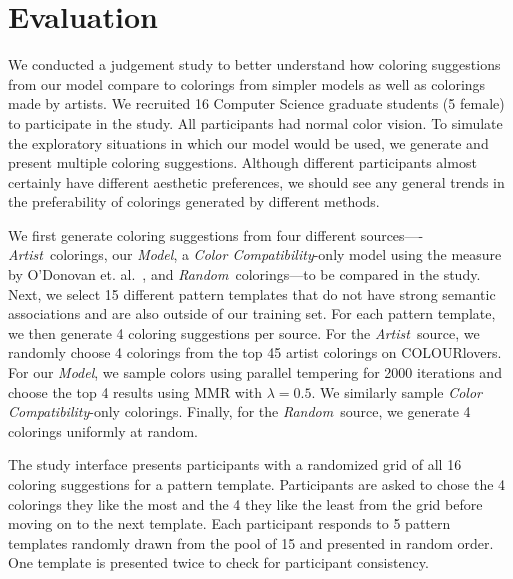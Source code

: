\section{Evaluation}
\label{sec:evaluation}

We conducted a judgement study to better understand how coloring suggestions from our model compare to colorings from simpler models as well as colorings made by artists. We recruited 16 Computer Science graduate students (5 female) to participate in the study. All participants had normal color vision. To simulate the exploratory situations in which our model would be used, we generate and present multiple coloring suggestions. Although different participants almost certainly have different aesthetic preferences, we should see any general trends in the preferability of colorings generated by different methods. 

\newcommand{\artistSource}{\emph{Artist}}
\newcommand{\modelSource}{\emph{Model}}
\newcommand{\compatSource}{\emph{Color Compatibility}}
\newcommand{\randomSource}{\emph{Random}}
We first generate coloring suggestions from four different sources----\artistSource~colorings, our \modelSource, a \compatSource-only model using the measure by O'Donovan et. al.~, and \randomSource~colorings---to be compared in the study. Next, we select 15 different pattern templates that do not have strong semantic associations and are also outside of our training set. For each pattern template, we then generate 4 coloring suggestions per source. For the \artistSource~source, we randomly choose 4 colorings from the top 45 artist colorings on COLOURlovers. For our \modelSource, we sample colors using parallel tempering for 2000 iterations and choose the top 4 results using MMR with $\lambda = 0.5$. We similarly sample \compatSource-only colorings. Finally, for the \randomSource~source, we generate 4 colorings uniformly at random.

The study interface presents participants with a randomized grid of all 16 coloring suggestions for a pattern template. Participants are asked to chose the 4 colorings they like the most and the 4 they like the least from the grid before moving on to the next template. Each participant responds to 5 pattern templates randomly drawn from the pool of 15 and presented in random order. One template is presented twice to check for participant consistency.


